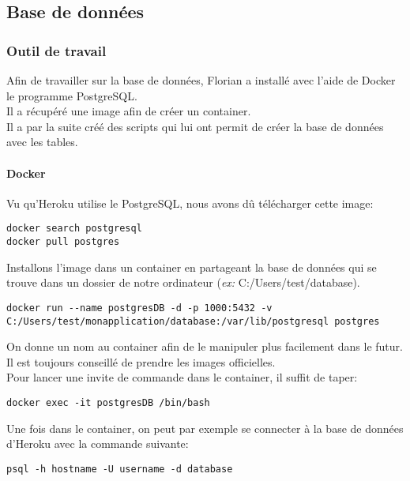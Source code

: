 \subsection{Base de données}
\subsubsection{Outil de travail}
Afin de travailler sur la base de données, Florian a installé avec l'aide de Docker le programme PostgreSQL. \\
Il a récupéré une image afin de créer un container. \\
Il a par la suite créé des scripts qui lui ont permit de créer la base de données avec les tables.

\paragraph{Docker}

Vu qu'Heroku utilise le PostgreSQL, nous avons dû télécharger cette image:

\begin{lstlisting}
docker search postgresql
docker pull postgres
\end{lstlisting}
Installons l'image dans un container en partageant la base de données qui se trouve dans un dossier de notre ordinateur (\textit{ex:} C:/Users/test/database).

\begin{lstlisting}
docker run --name postgresDB -d -p 1000:5432 -v C:/Users/test/monapplication/database:/var/lib/postgresql postgres
\end{lstlisting}

On donne un nom au container afin de le manipuler plus facilement dans le futur. \\
Il est toujours conseillé de prendre les images officielles. \\
Pour lancer une invite de commande dans le container, il suffit de taper:

\begin{lstlisting}
docker exec -it postgresDB /bin/bash
\end{lstlisting}

Une fois dans le container, on peut par exemple se connecter à la base de données d'Heroku avec la commande suivante:

\begin{lstlisting}
psql -h hostname -U username -d database
\end{lstlisting}

